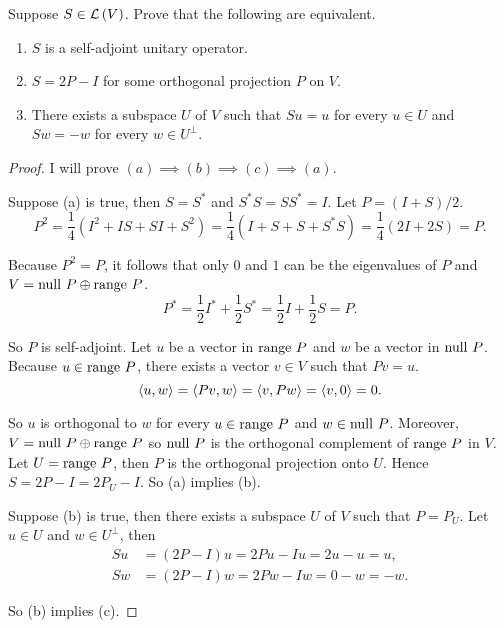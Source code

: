 \begin{exercise}
    Suppose $S\in\mathcal{L}\left({V}\right)$. Prove that the following are equivalent.
    \begin{enumerate}[label={(\alph*)}]
        \item $S$ is a self-adjoint unitary operator.
        \item $S = 2P - I$ for some orthogonal projection $P$ on $V$.
        \item There exists a subspace $U$ of $V$ such that $Su = u$ for every $u \in U$ and $Sw = -w$ for every $w \in U^{\bot}$.
    \end{enumerate}
\end{exercise}

\begin{proof}
    I will prove $(a) \implies (b) \implies (c) \implies (a)$.

    Suppose (a) is true, then $S = S^{*}$ and $S^{*}S = SS^{*} = I$. Let $P = (I + S)/2$.
    \[
        P^{2} = \frac{1}{4}(I^{2} + IS + SI + S^{2}) = \frac{1}{4}(I + S + S + S^{*}S) = \frac{1}{4}(2I + 2S) = P.
    \]

    Because $P^{2} = P$, it follows that only $0$ and $1$ can be the eigenvalues of $P$ and $V = \operatorname{null}\,{P}\oplus\operatorname{range}\,{P}$.
    \[
        P^{*} = \frac{1}{2}I^{*} + \frac{1}{2}S^{*} = \frac{1}{2}I + \frac{1}{2}S = P.
    \]

    So $P$ is self-adjoint. Let $u$ be a vector in $\operatorname{range}\,{P}$ and $w$ be a vector in $\operatorname{null}\,{P}$. Because $u\in\operatorname{range}\,{P}$, there exists a vector $v\in V$ such that $Pv = u$.
    \[
        \left\langle{u, w}\right\rangle = \left\langle{Pv, w}\right\rangle = \left\langle{v, Pw}\right\rangle = \left\langle{v, 0}\right\rangle = 0.
    \]

    So $u$ is orthogonal to $w$ for every $u\in\operatorname{range}\,{P}$ and $w\in\operatorname{null}\,{P}$. Moreover, $V = \operatorname{null}\,{P}\oplus\operatorname{range}\,{P}$ so $\operatorname{null}\,{P}$ is the orthogonal complement of $\operatorname{range}\,{P}$ in $V$. Let $U = \operatorname{range}\,{P}$, then $P$ is the orthogonal projection onto $U$. Hence $S = 2P - I = 2P_{U} - I$. So (a) implies (b).

    Suppose (b) is true, then there exists a subspace $U$ of $V$ such that $P = P_{U}$. Let $u\in U$ and $w\in U^{\bot}$, then
    \begin{align*}
        Su & = (2P - I)u = 2Pu - Iu = 2u - u = u, \\
        Sw & = (2P - I)w = 2Pw - Iw = 0 - w = -w.
    \end{align*}

    So (b) implies (c).


\end{proof}
